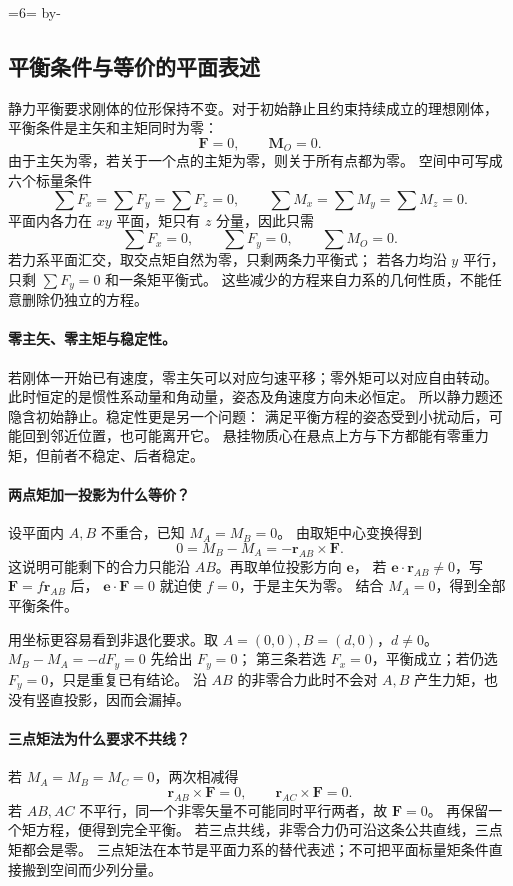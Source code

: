 \documentclass[UTF8,zihao=-4,fontset=fandol,a4paper]{ctexart}
\makeatletter
\newcommand{\vect}[1]{\bm{#1}}
\newcommand{\Needspace}[1]{\par\if@nobreak\else\penalty0\begingroup\dimen0=#1\relax\dimen2=\pagegoal\advance\dimen2 by-\pagetotal\ifdim\dimen0>\dimen2\newpage\fi\endgroup\fi}
\let\SavedSubsection\subsection
\renewcommand{\subsection}{\Needspace{6\baselineskip}\SavedSubsection}
\makeatother
\begin{document}
\subsection{平衡条件与等价的平面表述}\label{sub:c3-4.5}
静力平衡要求刚体的位形保持不变。对于初始静止且约束持续成立的理想刚体，
平衡条件是主矢和主矩同时为零：
\begin{equation}
\vect F=0,\qquad\vect M_O=0.
\end{equation}
由于主矢为零，若关于一个点的主矩为零，则关于所有点都为零。
空间中可写成六个标量条件
\[
\sum F_x=\sum F_y=\sum F_z=0,
\qquad \sum M_x=\sum M_y=\sum M_z=0.
\]
平面内各力在 $xy$ 平面，矩只有 $z$ 分量，因此只需
\[
\sum F_x=0,\qquad\sum F_y=0,\qquad\sum M_O=0.
\]
若力系平面汇交，取交点矩自然为零，只剩两条力平衡式；
若各力均沿 $y$ 平行，只剩 $\sum F_y=0$ 和一条矩平衡式。
这些减少的方程来自力系的几何性质，不能任意删除仍独立的方程。

\paragraph{零主矢、零主矩与稳定性。}
若刚体一开始已有速度，零主矢可以对应匀速平移；零外矩可以对应自由转动。
此时恒定的是惯性系动量和角动量，姿态及角速度方向未必恒定。
所以静力题还隐含初始静止。稳定性更是另一个问题：
满足平衡方程的姿态受到小扰动后，可能回到邻近位置，也可能离开它。
悬挂物质心在悬点上方与下方都能有零重力矩，但前者不稳定、后者稳定。

\paragraph{两点矩加一投影为什么等价？}
设平面内 $A,B$ 不重合，已知 $M_A=M_B=0$。
由取矩中心变换得到
\[
0=M_B-M_A=-\vect r_{AB}\times\vect F.
\]
这说明可能剩下的合力只能沿 $AB$。再取单位投影方向 $\vect e$，
若 $\vect e\cdot\vect r_{AB}\ne0$，写 $\vect F=f\vect r_{AB}$ 后，
$\vect e\cdot\vect F=0$ 就迫使 $f=0$，于是主矢为零。
结合 $M_A=0$，得到全部平衡条件。

用坐标更容易看到非退化要求。取 $A=(0,0),B=(d,0)$，$d\ne0$。
$M_B-M_A=-dF_y=0$ 先给出 $F_y=0$；
第三条若选 $F_x=0$，平衡成立；若仍选 $F_y=0$，只是重复已有结论。
沿 $AB$ 的非零合力此时不会对 $A,B$ 产生力矩，也没有竖直投影，因而会漏掉。

\paragraph{三点矩法为什么要求不共线？}
若 $M_A=M_B=M_C=0$，两次相减得
\[
\vect r_{AB}\times\vect F=0,
\qquad \vect r_{AC}\times\vect F=0.
\]
若 $AB,AC$ 不平行，同一个非零矢量不可能同时平行两者，故 $\vect F=0$。
再保留一个矩方程，便得到完全平衡。
若三点共线，非零合力仍可沿这条公共直线，三点矩都会是零。
三点矩法在本节是平面力系的替代表述；不可把平面标量矩条件直接搬到空间而少列分量。
\end{document}
